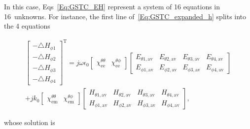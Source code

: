 \documentclass[journal,transaction]{IEEEtran}
\begin{document}
In this case, Eqs~\eqref{Eq:GSTC_EH} represent a system of 16 equations in 16~unknowns. For instance, the first line of~\eqref{Eq:GSTC_expanded_h} splits into the 4 equations
%
\begin{small}
\begin{equation}\label{Eq:GSTC_four_matrix}
\begin{split}
     \begin{bmatrix}
   -\triangle H_{\phi 1} \\
   -\triangle H_{\phi 2}\\
      -\triangle H_{\phi 3}\\
         -\triangle H_{\phi 4}
  \end{bmatrix}^\text{T}=j\omega\epsilon_0 \begin{bmatrix}
 \chi^{\theta\theta}_\text{ee}&\chi^{\theta\phi}_\text{ee}
  \end{bmatrix}\begin{bmatrix}
   E_{\theta1,\text{av}} &   E_{\theta2,\text{av}}&   E_{\theta3,\text{av}}&   E_{\theta4,\text{av}}\\
   E_{\phi1,\text{av}}&   E_{\phi2,\text{av}}&   E_{\phi3,\text{av}}&   E_{\phi4,\text{av}}
  \end{bmatrix}\\
  +jk_0 \begin{bmatrix}
\chi^{\theta \theta}_\text{em}&\chi^{\theta \phi}_\text{em}
  \end{bmatrix} \begin{bmatrix}
                  H_{\theta1,\text{av}}&H_{\theta2,\text{av}}&H_{\theta3,\text{av}}&H_{\theta4,\text{av}} \\
                  H_{\phi1,\text{av}}&H_{\phi2,\text{av}}&H_{\phi3,\text{av}}&H_{\phi4,\text{av}}
                \end{bmatrix},
\end{split}
\end{equation}
\end{small}
%
whose solution is
%
\end{document}
